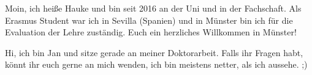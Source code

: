 \begin{multicols}{2}
{
Moin, ich heiße Hauke und bin seit 2016 an der Uni und in der Fachschaft. Als Erasmus Student war ich in Sevilla (Spanien) und in Münster bin ich für die Evaluation der Lehre zuständig. 
Euch ein herzliches Willkommen in Münster!
}

\vspace{0.2cm}

{
Hi, ich bin Jan und sitze gerade an meiner Doktorarbeit. Falls ihr Fragen habt, könnt ihr euch gerne an mich wenden, ich bin meistens netter, als ich aussehe. ;)
}


\end{multicols}
